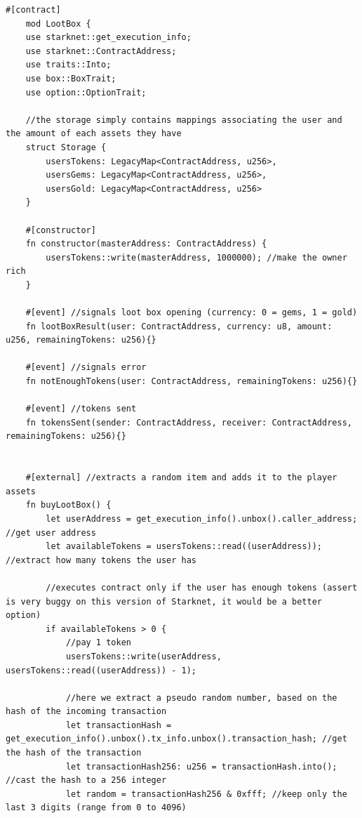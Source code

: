 \documentclass[12pt]{article}
\begin{document}
\begin{lstlisting}[language=cairo, caption={Loot box smart contract code. Can also be found at \url{https://github.com/Lapo9/Layer-2-Blockchains-for-Videogames/blob/master/LootBoxSmartContract/LootBoxSmartContract.cairo}}, captionpos=b]
    #[contract]
    mod LootBox {
    use starknet::get_execution_info;
    use starknet::ContractAddress;
    use traits::Into;
    use box::BoxTrait;
    use option::OptionTrait;

    //the storage simply contains mappings associating the user and the amount of each assets they have
    struct Storage {
        usersTokens: LegacyMap<ContractAddress, u256>,
        usersGems: LegacyMap<ContractAddress, u256>,
        usersGold: LegacyMap<ContractAddress, u256>
    }

    #[constructor]
    fn constructor(masterAddress: ContractAddress) {
        usersTokens::write(masterAddress, 1000000); //make the owner rich
    }

    #[event] //signals loot box opening (currency: 0 = gems, 1 = gold)
    fn lootBoxResult(user: ContractAddress, currency: u8, amount: u256, remainingTokens: u256){}

    #[event] //signals error
    fn notEnoughTokens(user: ContractAddress, remainingTokens: u256){}

    #[event] //tokens sent
    fn tokensSent(sender: ContractAddress, receiver: ContractAddress, remainingTokens: u256){}
    

    #[external] //extracts a random item and adds it to the player assets
    fn buyLootBox() {
        let userAddress = get_execution_info().unbox().caller_address; //get user address
        let availableTokens = usersTokens::read((userAddress)); //extract how many tokens the user has

        //executes contract only if the user has enough tokens (assert is very buggy on this version of Starknet, it would be a better option)
        if availableTokens > 0 {
            //pay 1 token
            usersTokens::write(userAddress, usersTokens::read((userAddress)) - 1);

            //here we extract a pseudo random number, based on the hash of the incoming transaction
            let transactionHash = get_execution_info().unbox().tx_info.unbox().transaction_hash; //get the hash of the transaction
            let transactionHash256: u256 = transactionHash.into(); //cast the hash to a 256 integer
            let random = transactionHash256 & 0xfff; //keep only the last 3 digits (range from 0 to 4096)
            

\end{lstlisting}
\end{document}
